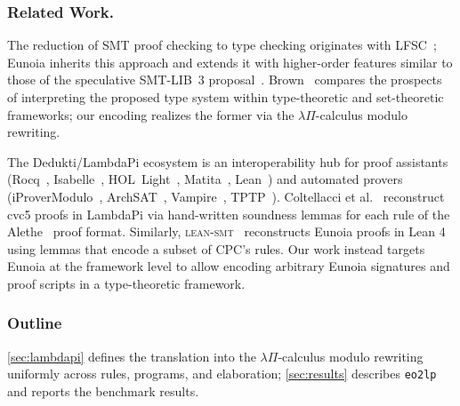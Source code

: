 \documentclass[class=llncs, crop=false]{standalone}
\begin{document}
\subsubsection{Related Work.}
The reduction of SMT proof checking to type
checking originates with
LFSC~\cite{DBLP:journals/fmsd/StumpORHT13};
Eunoia inherits this approach and extends it with
higher-order features similar to those of the
speculative SMT-LIB~3
proposal~\cite{barrettSMTLIB3Bringing,smt3-proposal,barbosa17hosmt}.
%
Brown~\cite{Brown2021} compares the prospects of interpreting
the proposed type system within type-theoretic and set-theoretic
frameworks; our encoding realizes the former via the $λΠ$-calculus
modulo rewriting.

The Dedukti/LambdaPi ecosystem is an interoperability hub for
proof assistants (Rocq~\cite{boespflug12coqine},
Isabelle~\cite{isabelle_dedukti},
HOL~Light~\cite{assaf15translating},
Matita~\cite{krajono},
Lean~\cite{vaishnav25lean4less})
and automated provers
(iProverModulo~\cite{burel20first},
ArchSAT~\cite{bury:tel-02612985},
Vampire~\cite{komel2025case},
TPTP~\cite{DBLP:conf/flairs/SutcliffeBB25}).
%
Coltellacci et al.~\cite{coltellacciReconstructionSMTProofs2024a,coltellacci25frocos}
reconstruct cvc5 proofs in LambdaPi via hand-written soundness lemmas for
each rule of the Alethe~\cite{schurrAletheGenericSMT2021} proof format.
%
Similarly, \textsc{lean-smt}~\cite{mohamed25leansmt}
reconstructs Eunoia proofs in Lean 4 using lemmas
that encode a subset of CPC's rules.
%
Our work instead targets Eunoia at the framework
level to allow encoding arbitrary
Eunoia signatures and proof scripts
in a type-theoretic framework.


\subsubsection*{Outline}
%
\autoref{sec:lambdapi} defines the translation into
the $λΠ$-calculus modulo rewriting uniformly across
rules, programs, and elaboration;
\autoref{sec:results} describes \texttt{eo2lp} and
reports the benchmark results.

%
\end{document}
